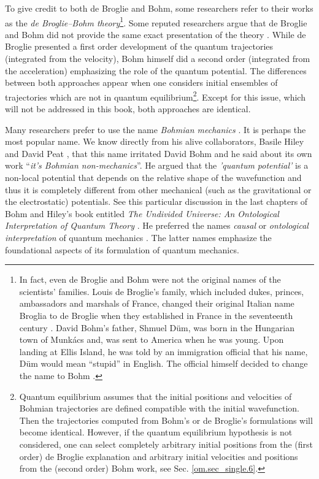 \documentclass[onecolumn,nofootinbib, secnumarabic, amsmath, nobibnotes,12pt,aps,pra]{revtex4-1}
\newcommand{\sref}[1]{Sec. \ref{#1}}
\begin{document}
To give credit to both de Broglie and Bohm, some researchers refer to their works as the \emph{de Broglie--Bohm theory}\footnote{In fact, even de Broglie and Bohm were not the original names of the scientists' families.  Louis de Broglie's family, which included dukes, princes, ambassadors and marshals of France, changed their original Italian name Broglia to de Broglie when they established in France in the seventeenth century \cite{om.valentini2009Solvay}. David Bohm's father,  Shmuel D\"um,  was born in the Hungarian town of Munk\'acs and, was sent to America when he was young. Upon landing at Ellis Island, he was told by an immigration official that his name, D\"um would mean ``stupid'' in English. The official himself decided to change the name to Bohm \cite{om.infinite_potential}.}\cite{om.Holand1993}.
Some reputed researchers argue that de Broglie and Bohm did not provide the same exact presentation of the theory \cite{om.Valentini2006,om.valentini2008}. While de Broglie presented a first order development of the quantum trajectories (integrated from the velocity), Bohm himself did a second order (integrated from the acceleration) emphasizing the role of the quantum potential. The differences between both approaches appear when one considers initial ensembles of trajectories which are not in quantum equilibrium\footnote{Quantum equilibrium assumes that the initial positions and velocities of Bohmian trajectories are defined compatible with the initial wavefunction. Then the trajectories computed from Bohm's or de Broglie's formulations will become identical. However, if the quantum equilibrium hypothesis is not considered, one can select completely arbitrary initial positions from the (first order) de Broglie explanation and arbitrary initial velocities and positions from the (second order) Bohm work, see \sref{om.sec_single.6}.}. Except for this issue, which will not be addressed in this book, both approaches are identical.

Many researchers prefer to use the name \emph{Bohmian mechanics} \cite{om.Bohmian1996}. It is perhaps the most popular name. We know directly from his alive collaborators, Basile Hiley and David Peat \cite{om.davidpeat}, that this name irritated David Bohm and he said about its own work ``\textit{it's Bohmian non-mechanics}''. He argued that the {\emph{'quantum potential'}} is a non-local potential that depends on the relative shape of the wavefunction and thus it is completely different from other mechanical (such as the gravitational or the electrostatic) potentials. See this particular discussion in the last chapters of Bohm and Hiley's book entitled \emph{The Undivided Universe: An Ontological Interpretation of Quantum Theory} \cite{om.Bohm1993}. He preferred the names \emph{causal} or \emph{ontological interpretation} of quantum mechanics \cite{om.Holand1993,om.Bohm1993}. The latter names emphasize the foundational aspects of its formulation of quantum mechanics.
\end{document}
